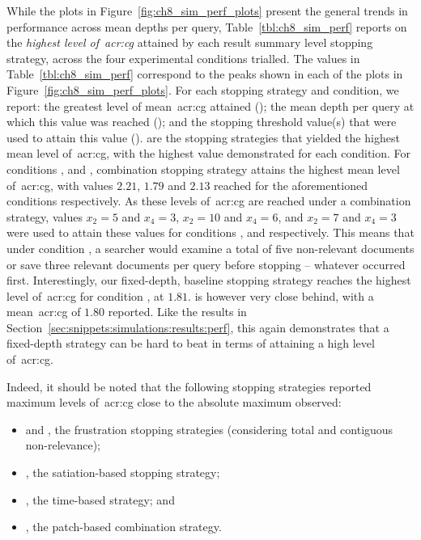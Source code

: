 While the plots in Figure~\ref{fig:ch8_sim_perf_plots} present the general trends in performance across mean depths per query, Table~\ref{tbl:ch8_sim_perf} reports on the \emph{highest level of~\gls{acr:cg}} attained by each result summary level stopping strategy, across the four experimental conditions trialled. The values in Table~\ref{tbl:ch8_sim_perf} correspond to the peaks shown in each of the plots in Figure~\ref{fig:ch8_sim_perf_plots}. For each stopping strategy and condition, we report: the greatest level of mean~\gls{acr:cg} attained (); the mean depth per query at which this value was reached (); and the stopping threshold value(s) that were used to attain this value ().  are the stopping strategies that yielded the highest mean level of~\gls{acr:cg}, with the highest value demonstrated for each condition. For conditions ,  and , combination stopping strategy  attains the highest mean level of~\gls{acr:cg}, with values $2.21$, $1.79$ and $2.13$ reached for the aforementioned conditions respectively. As these levels of~\gls{acr:cg} are reached under a combination strategy, values $x_2=5$ and $x_4=3$, $x_2=10$ and $x_4=6$, and $x_2=7$ and $x_4=3$ were used to attain these values for conditions ,  and  respectively. This means that under condition , a searcher would examine a total of five non-relevant documents or save three relevant documents per query before stopping -- whatever occurred first. Interestingly, our fixed-depth, baseline stopping strategy  reaches the highest level of~\gls{acr:cg} for condition , at $1.81$.  is however very close behind, with a mean~\gls{acr:cg} of $1.80$ reported. Like the results in Section~\ref{sec:snippets:simulations:results:perf}, this again demonstrates that a fixed-depth strategy can be hard to beat in terms of attaining a high level of~\gls{acr:cg}.

Indeed, it should be noted that the following stopping strategies reported maximum levels of~\gls{acr:cg} close to the absolute maximum observed:

\begin{itemize}
    
    \item{ and , the frustration stopping strategies (considering total and contiguous non-relevance);}
    \item{, the satiation-based stopping strategy;}
    \item{, the time-based strategy; and}
    \item{, the patch-based combination strategy.}
    
\end{itemize}

